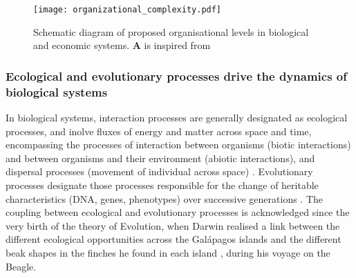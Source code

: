 \begin{figure}
    \centering
    \texttt{[image: organizational\_complexity.pdf]}
\caption{Schematic diagram of proposed organisational levels in biological and economic systems. \textbf{A} is inspired from \cite{Hendry+2016}}
\label{fig:organisational_levels}
\end{figure}





\subsubsection*{Ecological and evolutionary processes drive the dynamics of biological systems}
% 
%
% 
In biological systems, interaction processes are generally designated as ecological processes, and inolve fluxes of energy and matter across space and time, encompassing the processes of interaction between organisms (biotic interactions) and between organisms and their environment (abiotic interactions), and dispersal processes (movement of individual across space) \cite{Vellend2010a}.
% 
Evolutionary processes designate those processes responsible for the change of heritable characteristics (DNA, genes, phenotypes) over successive generations \cite{Hall2013}.
% 
The coupling between ecological and evolutionary processes is acknowledged since the very birth of the theory of Evolution, when Darwin realised a link between the different ecological opportunities across the Galápagos islands and the different beak shapes in the finches he found in each island \cite{darwin2004origin}, during his voyage on the Beagle.
